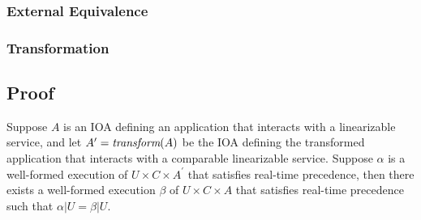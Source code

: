 \subsubsection{External Equivalence}
\label{sec:equivalence:preliminaries:equivalence}

\subsubsection{Transformation}
\label{sec:equivalence:preliminaries:transform}

\subsection{Proof}
\label{sec:equivalence:proof}

\begin{theorem}
  Suppose $A$ is an IOA defining an application that interacts with a linearizable service,
  and let $A^\prime = \operatorname*{\textit{transform}}(A)$ be the IOA defining the transformed application that
  interacts with a comparable \multidispatch{} linearizable service. Suppose $\alpha$ is a
  well-formed execution of $U \times C \times A^\prime$ that satisfies \multidispatch{} real-time
  precedence, then there exists a well-formed execution $\beta$ of $U \times C \times A$ that
  satisfies \singledispatch{} real-time precedence such that $\alpha | U = \beta | U$.
\end{theorem}

